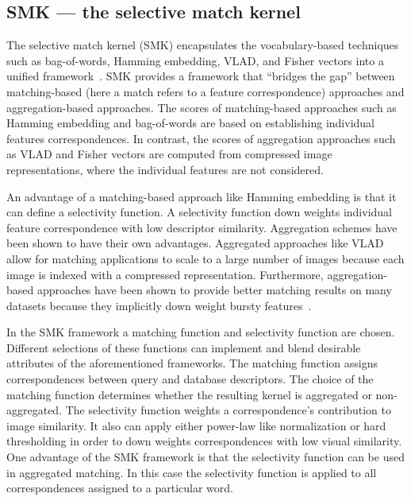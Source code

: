     \subsection{SMK --- the selective match kernel}\label{sec:smk}
        The selective match kernel (SMK) encapsulates the vocabulary-based techniques such as bag-of-words, Hamming
        embedding, VLAD, and Fisher vectors into a unified framework~\cite{bo_efficient_2009,
        tolias_aggregate_2013, tolias_image_2015, jegou_triangulation_2014}. SMK provides a framework that
        ``bridges the gap'' between matching-based (here a match refers to a feature correspondence) approaches and
        aggregation-based approaches. The scores of matching-based approaches such as Hamming embedding and
        bag-of-words are based on establishing individual features correspondences. In contrast, the scores of
        aggregation approaches such as VLAD and Fisher vectors are computed from compressed image representations,
        where the individual features are not considered.

        An advantage of a matching-based approach like Hamming embedding is that it can define a selectivity
        function. A selectivity function down weights individual feature correspondence with low descriptor
        similarity. Aggregation schemes have been shown to have their own advantages. Aggregated approaches like
        VLAD allow for matching applications to scale to a large number of images because each image is indexed
        with a compressed representation. Furthermore, aggregation-based approaches have been shown to provide
        better matching results on many datasets because they implicitly down weight bursty
        features~\cite{tolias_aggregate_2013, tolias_image_2015}.

        In the SMK framework a matching function and selectivity function are chosen. Different selections of these
        functions can implement and blend desirable attributes of the aforementioned frameworks. The matching
        function assigns correspondences between query and database descriptors. The choice of the matching
        function determines whether the resulting kernel is aggregated or non-aggregated. The selectivity function
        weights a correspondence's contribution to image similarity. It also can apply either power-law like
        normalization or hard thresholding in order to down weights correspondences with low visual similarity. One
        advantage of the SMK framework is that the selectivity function can be used in aggregated matching. In this
        case the selectivity function is applied to all correspondences assigned to a particular word.

